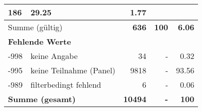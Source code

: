 \begin{longtable}{lXrrr}
       \num{186} &
       \num[round-mode=places,round-precision=2]{29,25} &
         \num[round-mode=places,round-precision=2]{1,77} \\
     \midrule
     \multicolumn{2}{l}{Summe (gültig)} &
       \textbf{\num{636}} &
     \textbf{100} &
       \textbf{\num[round-mode=places,round-precision=2]{6,06}} \\
     \multicolumn{5}{l}{\textbf{Fehlende Werte}}\\
       -998 &
       keine Angabe &
         \num{34} &
        - &
         \num[round-mode=places,round-precision=2]{0,32} \\
       -995 &
       keine Teilnahme (Panel) &
         \num{9818} &
        - &
         \num[round-mode=places,round-precision=2]{93,56} \\
       -989 &
       filterbedingt fehlend &
         \num{6} &
        - &
         \num[round-mode=places,round-precision=2]{0,06} \\
     \midrule
     \multicolumn{2}{l}{\textbf{Summe (gesamt)}} &
          \textbf{\num{10494}} &
        \textbf{-} &
        \textbf{100} \\
     \bottomrule
     \end{longtable}
     
